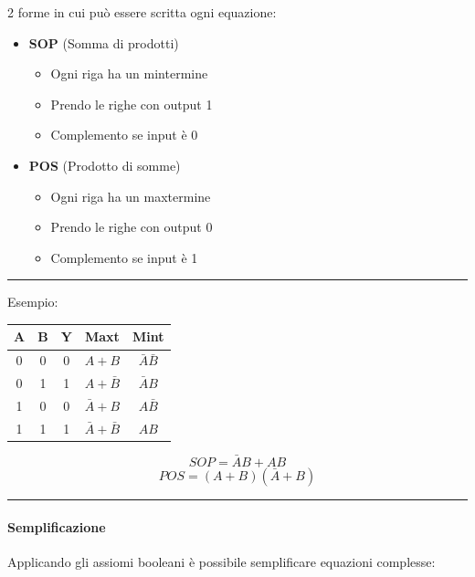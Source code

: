 \documentclass{article}
\begin{document}
2 forme in cui può essere scritta ogni equazione:
\begin{itemize}
    \item \textbf{SOP} (Somma di prodotti) 
        \begin{itemize}
            \item Ogni riga ha un mintermine
            \item Prendo le righe con output 1
            \item Complemento se input è 0
        \end{itemize}
    \item \textbf{POS} (Prodotto di somme)
            \begin{itemize}
            \item Ogni riga ha un maxtermine
            \item Prendo le righe con output 0
            \item Complemento se input è 1
        \end{itemize}
\end{itemize}

\noindent\rule{\textwidth}{0.5pt}

Esempio:
    
    \begin{table}[ht]
        \centering
        \begin{tabular}{cc|c|c|c}
            A & B & Y & Maxt & Mint\\
            \hline
            \rule{0pt}{3ex}0 & 0 & 0 & $A+B$ & $\bar{A}\bar{B}$\\
            0 & 1 & 1 & $A+\bar{B}$ & $\bar{A}B$\\
            1 & 0 & 0 & $\bar{A}+B$ & $A\bar{B}$\\
            1 & 1 & 1 & $\bar{A}+\bar{B}$ & $AB$\\
        \end{tabular}

    \end{table}

$$SOP = \bar{A}B+AB$$
$$POS=(A+B)(\bar{A}+B)$$

\noindent\rule{\textwidth}{0.5pt}

\paragraph{Semplificazione}

Applicando gli assiomi booleani è possibile semplificare equazioni complesse:
\end{document}
